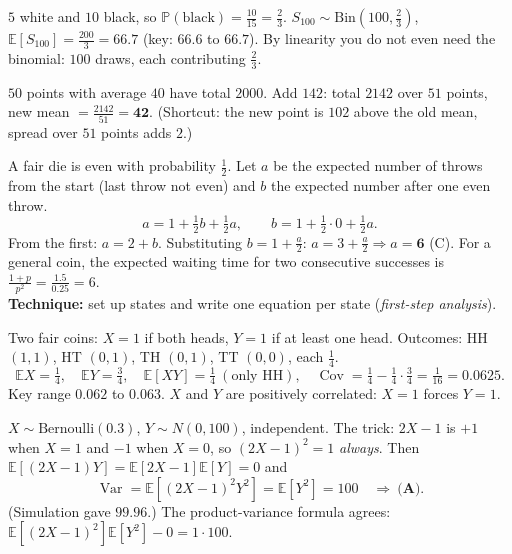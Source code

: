 \documentclass[11pt,a4paper]{article}
\newcommand{\E}{\mathbb{E}}
\newcommand{\Var}{\operatorname{Var}}
\newcommand{\Cov}{\operatorname{Cov}}
\renewcommand{\Pr}{\mathbb{P}}
\begin{document}
\begin{example}
$5$ white and $10$ black, so $\Pr(\text{black})=\frac{10}{15}=\frac23$. $S_{100}\sim\text{Bin}(100,\tfrac23)$, $\E[S_{100}]=\frac{200}{3}=\mathbf{66.7}$ (key: $66.6$ to $66.7$). By linearity you do not even need the binomial: $100$ draws, each contributing $\frac23$.
\end{example}

\begin{example}
$50$ points with average $40$ have total $2000$. Add $142$: total $2142$ over $51$ points, new mean $=\frac{2142}{51}=\mathbf{42}$. (Shortcut: the new point is $102$ above the old mean, spread over $51$ points adds $2$.)
\end{example}

\begin{example}
A fair die is even with probability $\frac12$. Let $a$ be the expected number of throws from the start (last throw not even) and $b$ the expected number after one even throw.
\[a=1+\tfrac12 b+\tfrac12 a,\qquad b=1+\tfrac12\cdot0+\tfrac12 a.\]
From the first: $a=2+b$. Substituting $b=1+\tfrac a2$: $a=3+\tfrac a2\Rightarrow a=\mathbf6$ \quad (C). For a general coin, the expected waiting time for two consecutive successes is $\frac{1+p}{p^2}=\frac{1.5}{0.25}=6$.\\
\textbf{Technique:} set up states and write one equation per state (\emph{first-step analysis}).
\end{example}

\begin{example}
Two fair coins: $X=1$ if both heads, $Y=1$ if at least one head. Outcomes: HH $(1,1)$, HT $(0,1)$, TH $(0,1)$, TT $(0,0)$, each $\frac14$.
\[\E X=\tfrac14,\quad\E Y=\tfrac34,\quad\E[XY]=\tfrac14\ (\text{only HH}),\quad\Cov=\tfrac14-\tfrac14\cdot\tfrac34=\tfrac1{16}=\mathbf{0.0625}.\]
Key range $0.062$ to $0.063$. $X$ and $Y$ are positively correlated: $X=1$ forces $Y=1$.
\end{example}

\begin{example}
$X\sim\text{Bernoulli}(0.3)$, $Y\sim N(0,100)$, independent. The trick: $2X-1$ is $+1$ when $X=1$ and $-1$ when $X=0$, so $(2X-1)^2=1$ \emph{always}. Then $\E[(2X-1)Y]=\E[2X-1]\E[Y]=0$ and
\[\Var=\E[(2X-1)^2Y^2]=\E[Y^2]=100\quad\Rightarrow\ \textbf{(A)}.\]
(Simulation gave $99.96$.) The product-variance formula agrees: $\E[(2X-1)^2]\E[Y^2]-0=1\cdot100$.
\end{example}
\end{document}
